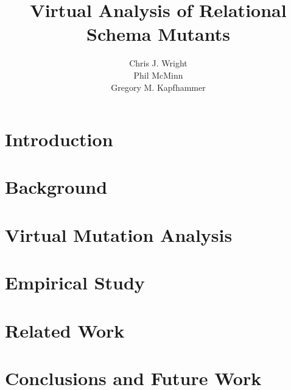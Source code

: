 \documentclass{sig-alternate}
\begin{document}
\title{Virtual Analysis of Relational Schema Mutants}


\author{
\alignauthor
Chris J. Wright\\
\alignauthor
Phil McMinn\\
\alignauthor
Gregory M. Kapfhammer\\
}

\maketitle

\begin{abstract}
\end{abstract}

\section{Introduction}
\label{sec:introduction}

\section{Background}
\label{sec:background}

\section{Virtual Mutation Analysis}
\label{sec:virtual-mutation-analysis}

\section{Empirical Study}
\label{sec:empirical-study}

\section{Related Work}
\label{sec:related-work}

\section{Conclusions and Future Work}
\label{sec:conclusions-and-future-work}
\end{document}
